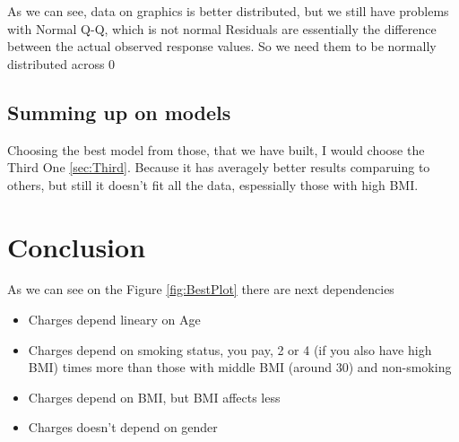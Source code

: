 \documentclass{article}
\begin{document}
As we can see, data on graphics is better distributed, but we still have problems with Normal Q-Q, which is not normal  
Residuals are essentially the difference between the actual observed response values. So we need them to be normally distributed across 0




\subsection{Summing up on models}

Choosing the best model from those, that we have built, I would choose the Third One \ref{sec:Third}. Because it has averagely better results comparuing to others, but 
still it doesn't fit all the data, espessially those with high BMI. 



\section{Conclusion}
As we can see on the Figure \ref{fig:BestPlot} there are next dependencies
\begin{itemize}
  \item Charges depend lineary on Age
  \item Charges depend on smoking status, you pay, 2 or 4 (if you also have high BMI) times more than those with middle BMI (around 30) and non-smoking
  \item Charges depend on BMI, but BMI affects less
  \item Charges doesn't depend on gender
\end{itemize}
\end{document}
